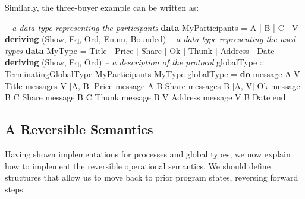 \documentclass[runningheads,plain]{llncs}
\newenvironment{Shaded}{}{}
\newcommand{\KeywordTok}[1]{\textcolor[rgb]{0.00,0.44,0.13}{\textbf{#1}}}
\newcommand{\DataTypeTok}[1]{\textcolor[rgb]{0.56,0.13,0.00}{#1}}
\newcommand{\CommentTok}[1]{\textcolor[rgb]{0.38,0.63,0.69}{\textit{#1}}}
\newcommand{\OtherTok}[1]{\textcolor[rgb]{0.00,0.44,0.13}{#1}}
\newcommand{\FunctionTok}[1]{\textcolor[rgb]{0.02,0.16,0.49}{#1}}
\newcommand{\NormalTok}[1]{#1}
\begin{document}
\noindent
Similarly, the three-buyer example can be written as:
\begin{Shaded}
\begin{Highlighting}[]
\CommentTok{-- a data type representing the participants}
\KeywordTok{data} \DataTypeTok{MyParticipants} \FunctionTok{=} \DataTypeTok{A} \FunctionTok{|} \DataTypeTok{B} \FunctionTok{|} \DataTypeTok{C} \FunctionTok{|} \DataTypeTok{V} 
    \KeywordTok{deriving}\NormalTok{ (}\DataTypeTok{Show}\NormalTok{, }\DataTypeTok{Eq}\NormalTok{, }\DataTypeTok{Ord}\NormalTok{, }\DataTypeTok{Enum}\NormalTok{, }\DataTypeTok{Bounded}\NormalTok{)}
\CommentTok{-- a data type representing the used types }
\KeywordTok{data} \DataTypeTok{MyType} \FunctionTok{=} \DataTypeTok{Title} \FunctionTok{|} \DataTypeTok{Price} \FunctionTok{|} \DataTypeTok{Share} \FunctionTok{|} \DataTypeTok{Ok} \FunctionTok{|} \DataTypeTok{Thunk} \FunctionTok{|} \DataTypeTok{Address} \FunctionTok{|} \DataTypeTok{Date}
    \KeywordTok{deriving}\NormalTok{ (}\DataTypeTok{Show}\NormalTok{, }\DataTypeTok{Eq}\NormalTok{, }\DataTypeTok{Ord}\NormalTok{)}
\CommentTok{-- a description of the protocol}
\OtherTok{globalType ::} \DataTypeTok{TerminatingGlobalType} \DataTypeTok{MyParticipants} \DataTypeTok{MyType}
\NormalTok{globalType }\FunctionTok{=} \KeywordTok{do} 
\NormalTok{    message }\DataTypeTok{A} \DataTypeTok{V} \DataTypeTok{Title} 
\NormalTok{    messages }\DataTypeTok{V}\NormalTok{ [}\DataTypeTok{A}\NormalTok{, }\DataTypeTok{B}\NormalTok{] }\DataTypeTok{Price} 
\NormalTok{    message }\DataTypeTok{A} \DataTypeTok{B} \DataTypeTok{Share} 
\NormalTok{    messages }\DataTypeTok{B}\NormalTok{ [}\DataTypeTok{A}\NormalTok{, }\DataTypeTok{V}\NormalTok{] }\DataTypeTok{Ok} 
\NormalTok{    message }\DataTypeTok{B} \DataTypeTok{C} \DataTypeTok{Share}
\NormalTok{    message }\DataTypeTok{B} \DataTypeTok{C} \DataTypeTok{Thunk}
\NormalTok{    message }\DataTypeTok{B} \DataTypeTok{V} \DataTypeTok{Address}
\NormalTok{    message }\DataTypeTok{V} \DataTypeTok{B} \DataTypeTok{Date}
\NormalTok{    end}
\end{Highlighting}
\end{Shaded}

\subsection{A Reversible Semantics}\label{a-reversible-semantics}
Having shown  implementations for processes and global types, we now explain how to implement the  reversible operational semantics. We should define structures that allow us to move back to prior program states, reversing forward
steps.
\end{document}
